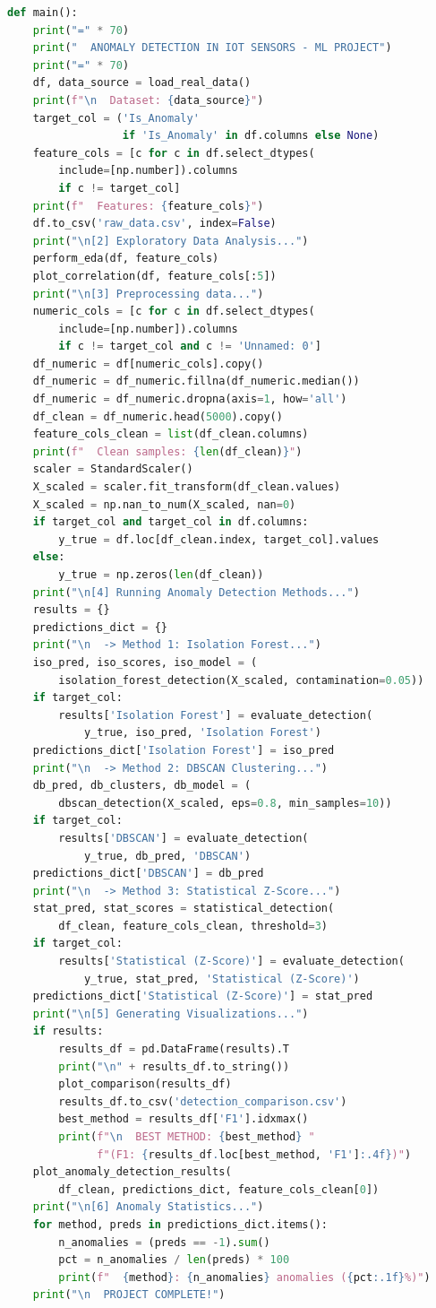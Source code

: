 \documentclass[12pt,a4paper]{report}
\begin{document}
\begin{lstlisting}[language=Python, caption={Main pipeline}]
def main():
    print("=" * 70)
    print("  ANOMALY DETECTION IN IOT SENSORS - ML PROJECT")
    print("=" * 70)
    df, data_source = load_real_data()
    print(f"\n  Dataset: {data_source}")
    target_col = ('Is_Anomaly'
                  if 'Is_Anomaly' in df.columns else None)
    feature_cols = [c for c in df.select_dtypes(
        include=[np.number]).columns
        if c != target_col]
    print(f"  Features: {feature_cols}")
    df.to_csv('raw_data.csv', index=False)
    print("\n[2] Exploratory Data Analysis...")
    perform_eda(df, feature_cols)
    plot_correlation(df, feature_cols[:5])
    print("\n[3] Preprocessing data...")
    numeric_cols = [c for c in df.select_dtypes(
        include=[np.number]).columns
        if c != target_col and c != 'Unnamed: 0']
    df_numeric = df[numeric_cols].copy()
    df_numeric = df_numeric.fillna(df_numeric.median())
    df_numeric = df_numeric.dropna(axis=1, how='all')
    df_clean = df_numeric.head(5000).copy()
    feature_cols_clean = list(df_clean.columns)
    print(f"  Clean samples: {len(df_clean)}")
    scaler = StandardScaler()
    X_scaled = scaler.fit_transform(df_clean.values)
    X_scaled = np.nan_to_num(X_scaled, nan=0)
    if target_col and target_col in df.columns:
        y_true = df.loc[df_clean.index, target_col].values
    else:
        y_true = np.zeros(len(df_clean))
    print("\n[4] Running Anomaly Detection Methods...")
    results = {}
    predictions_dict = {}
    print("\n  -> Method 1: Isolation Forest...")
    iso_pred, iso_scores, iso_model = (
        isolation_forest_detection(X_scaled, contamination=0.05))
    if target_col:
        results['Isolation Forest'] = evaluate_detection(
            y_true, iso_pred, 'Isolation Forest')
    predictions_dict['Isolation Forest'] = iso_pred
    print("\n  -> Method 2: DBSCAN Clustering...")
    db_pred, db_clusters, db_model = (
        dbscan_detection(X_scaled, eps=0.8, min_samples=10))
    if target_col:
        results['DBSCAN'] = evaluate_detection(
            y_true, db_pred, 'DBSCAN')
    predictions_dict['DBSCAN'] = db_pred
    print("\n  -> Method 3: Statistical Z-Score...")
    stat_pred, stat_scores = statistical_detection(
        df_clean, feature_cols_clean, threshold=3)
    if target_col:
        results['Statistical (Z-Score)'] = evaluate_detection(
            y_true, stat_pred, 'Statistical (Z-Score)')
    predictions_dict['Statistical (Z-Score)'] = stat_pred
    print("\n[5] Generating Visualizations...")
    if results:
        results_df = pd.DataFrame(results).T
        print("\n" + results_df.to_string())
        plot_comparison(results_df)
        results_df.to_csv('detection_comparison.csv')
        best_method = results_df['F1'].idxmax()
        print(f"\n  BEST METHOD: {best_method} "
              f"(F1: {results_df.loc[best_method, 'F1']:.4f})")
    plot_anomaly_detection_results(
        df_clean, predictions_dict, feature_cols_clean[0])
    print("\n[6] Anomaly Statistics...")
    for method, preds in predictions_dict.items():
        n_anomalies = (preds == -1).sum()
        pct = n_anomalies / len(preds) * 100
        print(f"  {method}: {n_anomalies} anomalies ({pct:.1f}%)")
    print("\n  PROJECT COMPLETE!")


\end{lstlisting}
\end{document}
